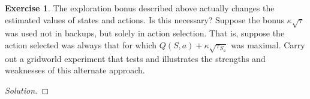\documentclass[oneside,11pt]{article}
\theoremstyle{definition}
\newtheorem{exer}[thm]{Exercise}
\newenvironment{solution}
{\renewcommand\qedsymbol{$\blacksquare$}\begin{proof}[Solution]} {\end{proof}}
\begin{document}
\begin{exer}

The exploration bonus described above actually changes the estimated values of states and actions. Is this necessary? Suppose the bonus $\kappa \sqrt{\tau}$ was used not in backups, but solely in action selection. That is, suppose the action selected was always that for which $Q(S, a) +\kappa \sqrt{\tau_{S_a}}$ was maximal. Carry out a gridworld experiment that tests and illustrates the strengths and weaknesses of this alternate approach.
\end{exer}


\begin{shaded}
\begin{solution} 


\end{solution} 
\end{shaded}






  
\end{document}

